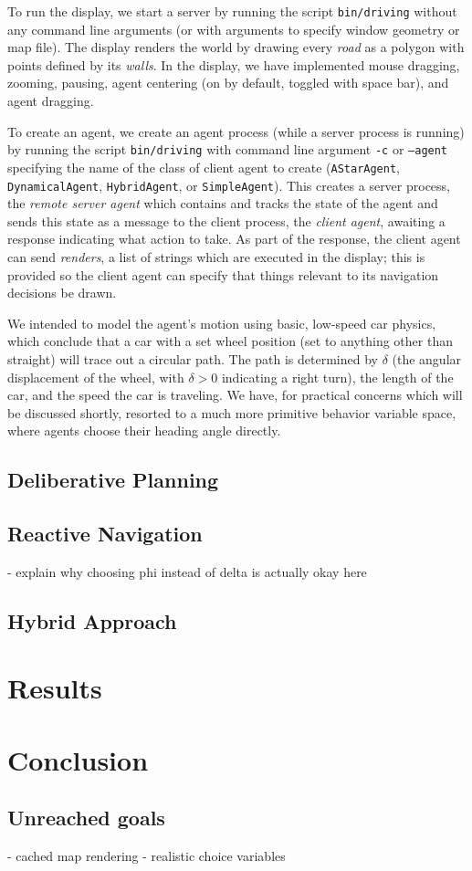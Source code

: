 \documentclass{article}
\newcommand{\code}{\texttt}
\begin{document}
To run the display, we start a server by running the script \code{bin/driving}
without any command line arguments (or with arguments to specify window geometry
or map file). The display renders the world by drawing every \emph{road} as a
polygon with points defined by its \emph{walls}. In the display, we have
implemented mouse dragging, zooming, pausing, agent centering (on by default,
toggled with space bar), and agent dragging.

To create an agent, we create an agent process (while a server process is
running) by running the script \code{bin/driving} with command line argument
\code{-c} or \code{--agent} specifying the name of the class of client agent to
create (\code{AStarAgent}, \code{DynamicalAgent}, \code{HybridAgent}, or
\code{SimpleAgent}). This creates a server process, the \emph{remote server
  agent} which contains and tracks the state of the agent and sends this state
as a message to the client process, the \emph{client agent}, awaiting a response
indicating what action to take. As part of the response, the client agent
can send \emph{renders}, a list of strings which are executed in the display;
this is provided so the client agent can specify that things relevant to
its navigation decisions be drawn.

We intended to model the agent's motion using basic, low-speed car physics,
which conclude that a car with a set wheel position (set to anything other than
straight) will trace out a circular path. The path is determined by $\delta$
(the angular displacement of the wheel, with $\delta>0$ indicating a right
turn), the length of the car, and the speed the car is traveling. We have, for
practical concerns which will be discussed shortly, resorted to a much more
primitive behavior variable space, where agents choose their heading angle
directly.

\subsection{Deliberative Planning}

\subsection{Reactive Navigation}
- explain why choosing phi instead of delta is actually okay here

\subsection{Hybrid Approach}

\section{Results}

\section{Conclusion}
\subsection{Unreached goals}
- cached map rendering
- realistic choice variables
\end{document}
